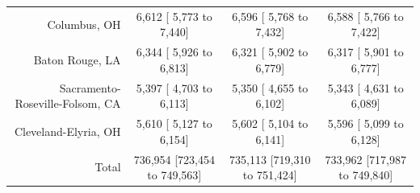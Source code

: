 \documentclass{article}
\begin{document}
\begin{table}[H]
\begin{tabular}{|r|c|c|c|}
		Columbus, OH &   6,612 [  5,773 to   7,440] &   6,596 [  5,768 to   7,432] &   6,588 [  5,766 to   7,422]\\
		Baton Rouge, LA &   6,344 [  5,926 to   6,813] &   6,321 [  5,902 to   6,779] &   6,317 [  5,901 to   6,777]\\
		Sacramento-Roseville-Folsom, CA &   5,397 [  4,703 to   6,113] &   5,350 [  4,655 to   6,102] &   5,343 [  4,631 to   6,089]\\
		Cleveland-Elyria, OH &   5,610 [  5,127 to   6,154] &   5,602 [  5,104 to   6,141] &   5,596 [  5,099 to   6,128]\\
		\hline
		Total & 736,954 [723,454 to 749,563] & 735,113 [719,310 to 751,424] & 733,962 [717,987 to 749,840]\\
		\hline
	\end{tabular}
\end{table}
\end{document}
